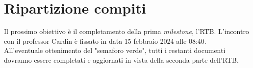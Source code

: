 \documentclass[5pt]{article}
\begin{document}
\section{Ripartizione compiti}
Il prossimo obiettivo è il completamento della prima \textit{milestone}, l'RTB. L'incontro con il professor Cardin è fissato in data 15 febbraio 2024 alle 08:40.\\ All'eventuale ottenimento del "semaforo verde", tutti i restanti documenti dovranno essere completati e aggiornati in vista della seconda parte dell'RTB.
\end{document}
